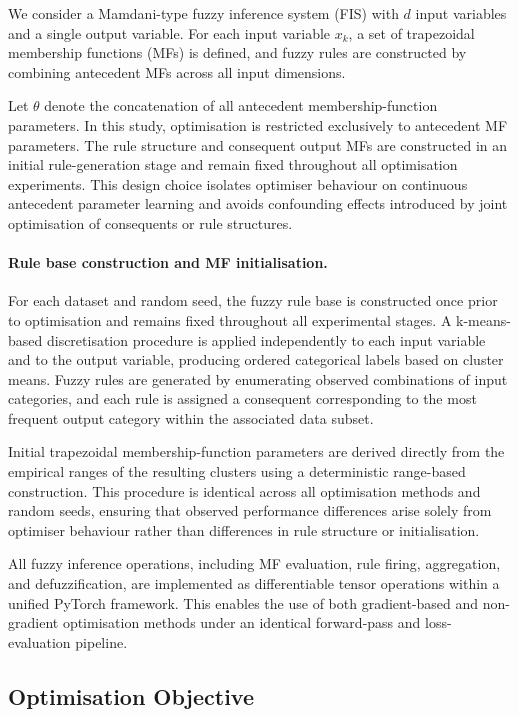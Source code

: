 \documentclass[a4paper,12pt,oneside]{article}
\begin{document}
We consider a Mamdani-type fuzzy inference system (FIS) with $d$ input variables
and a single output variable.
For each input variable $x_k$, a set of trapezoidal membership functions (MFs)
is defined, and fuzzy rules are constructed by combining antecedent MFs across
all input dimensions.

Let $\theta$ denote the concatenation of all antecedent membership-function
parameters.
In this study, optimisation is restricted exclusively to antecedent MF
parameters.
The rule structure and consequent output MFs are constructed in an initial
rule-generation stage and remain fixed throughout all optimisation experiments.
This design choice isolates optimiser behaviour on continuous antecedent
parameter learning and avoids confounding effects introduced by joint
optimisation of consequents or rule structures.

\paragraph*{Rule base construction and MF initialisation.}
For each dataset and random seed, the fuzzy rule base is constructed once
prior to optimisation and remains fixed throughout all experimental stages.
A k-means-based discretisation procedure is applied independently to each
input variable and to the output variable, producing ordered categorical
labels based on cluster means.
Fuzzy rules are generated by enumerating observed combinations of input
categories, and each rule is assigned a consequent corresponding to the most
frequent output category within the associated data subset.

Initial trapezoidal membership-function parameters are derived directly from
the empirical ranges of the resulting clusters using a deterministic
range-based construction.
This procedure is identical across all optimisation methods and random seeds,
ensuring that observed performance differences arise solely from optimiser
behaviour rather than differences in rule structure or initialisation.

All fuzzy inference operations, including MF evaluation, rule firing,
aggregation, and defuzzification, are implemented as differentiable tensor
operations within a unified PyTorch framework.
This enables the use of both gradient-based and non-gradient optimisation
methods under an identical forward-pass and loss-evaluation pipeline.
\subsection{Optimisation Objective}
\end{document}
